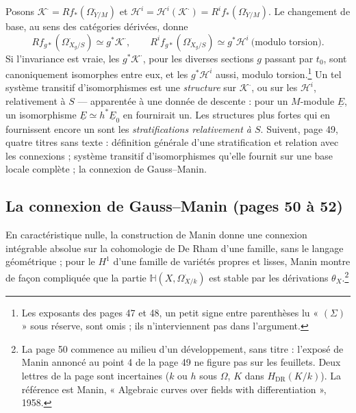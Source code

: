 \documentclass[11pt,a4paper]{article}
\begin{document}
Posons $\mathcal{K}^{\cdot} = Rf_{*}(\Omega^{\cdot}_{Y/M})$ et
$\mathcal{H}^{i} = \mathcal{H}^{i}(\mathcal{K}^{\cdot}) =
R^{i}f_{*}(\Omega^{\cdot}_{Y/M})$. Le changement de base, au sens des
catégories dérivées, donne
\[
  Rf_{g*}(\Omega^{\cdot}_{X_g/S}) \simeq g^{*}\mathcal{K}^{\cdot} ,
  \qquad
  R^{i}f_{g*}(\Omega^{\cdot}_{X_g/S}) \simeq g^{*}\mathcal{H}^{i}
  \ \text{(modulo torsion)} .
\]
Si l'invariance est vraie, les $g^{*}\mathcal{K}^{\cdot}$, pour les
diverses sections $g$ passant par $t_0$, sont canoniquement isomorphes entre
eux, et les $g^{*}\mathcal{H}^{i}$ aussi, modulo torsion.\footnote{Les
exposants des pages 47 et 48, un petit signe entre parenthèses lu « $(\Sigma)$ »
sous réserve, sont omis ; ils n'interviennent pas dans l'argument.} Un tel
système transitif d'isomorphismes est une \emph{structure} sur
$\mathcal{K}^{\cdot}$, ou sur les $\mathcal{H}^{i}$, relativement à $S$ —
apparentée à une donnée de descente : pour un $M$-module $\underline{E}$, un
isomorphisme $\underline{E} \simeq h^{*}\underline{E}_0$ en fournirait un.
Les structures plus fortes qui en fournissent encore un sont les
\emph{stratifications relativement à $S$}. Suivent, page 49, quatre titres
sans texte : définition générale d'une stratification et relation avec les
connexions ; système transitif d'isomorphismes qu'elle fournit sur une base
locale complète ; la connexion de Gauss--Manin.

\subsection*{La connexion de Gauss--Manin (pages 50 à 52)}

En caractéristique nulle, la construction de Manin donne une connexion
intégrable absolue sur la cohomologie de De Rham d'une famille, sans le
langage géométrique ; pour le $H^{1}$ d'une famille de variétés propres et
lisses, Manin montre de façon compliquée que la partie
$\mathbb{H}(X, \Omega^{\cdot}_{X/k})$ est stable par les dérivations
$\theta_X$.\footnote{La page 50 commence au milieu d'un développement, sans
titre : l'exposé de Manin annoncé au point 4 de la page 49 ne figure pas
sur les feuillets. Deux lettres de la page sont incertaines ($k$ ou $h$ sous
$\Omega$, $K$ dans $H_{\mathrm{DR}}(K/k)$). La référence est Manin,
« Algebraic curves over fields with differentiation », 1958.}
\end{document}
